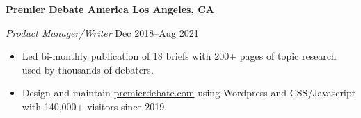 \textbf{Premier Debate America \hfill  Los Angeles, CA} \par
\textit{Product Manager/Writer} \hfill Dec 2018--Aug 2021 \par
\begin{itemize}
	\item Led bi-monthly publication of 18 briefs with 200+ pages of topic research used by thousands of debaters.
	\item Design and maintain \href{https://www.premierdebate.com/briefs/}{premierdebate.com} using Wordpress and CSS/Javascript with 140,000+ visitors since 2019.
\end{itemize} \par